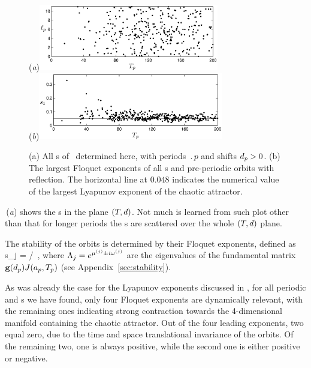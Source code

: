 \begin{figure}[t]
\begin{center}
(\textit{a})\hspace{1ex}\includegraphics[width=0.7\textwidth, clip=true]
                            {../figs/ks22_rpos_Tdelta.eps}\\
(\textit{b})\includegraphics[width=0.72\textwidth, clip=true]
                            {../figs/ks22_rpos_lyap.eps}
\end{center}
\caption{
(a) All \rpo s of \KSe\ determined here, with periods $\period{p}$ and
shifts $d_p > 0$.
(b) The largest Floquet exponents  of all
\rpo s and pre-periodic orbits with reflection.
The horizontal line at $0.048$
indicates the numerical value  of the largest
Lyapunov exponent of the chaotic attractor.
} \label{f:ks22rposT}
\end{figure}

\,(\textit{a}) shows the \rpo s in the plane
$({T_{}},d)$.  Not much is learned from such plot other than
that for longer periods the \rpo s are scattered over the
whole $({T_{}},d)$ plane.

The stability of the orbits is determined by their Floquet exponents,
defined as
\beq
    s_j = \eigRe[j]/ \,,
where $\ExpaEig_j = e^{\eigRe[j] \pm i \eigIm[j]}$ are the
eigenvalues of the fundamental matrix $\mathbf{g}(d_p)J(a_p,{T_{p}})$
(see Appendix~\ref{sec:stability}).

As was already the case for the Lyapunov exponents
discussed in , for all
periodic and \rpo s we have found, only four Floquet
exponents are dynamically relevant, with the remaining ones indicating
strong contraction towards the 4-dimensional manifold containing the chaotic attractor.
Out of the four leading exponents, two equal zero, due to
the time and space translational invariance of the orbits.  Of the
remaining two, one is always positive, while the second one is
either positive or negative.

